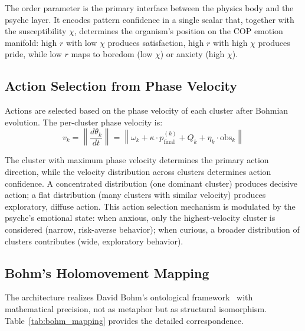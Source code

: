 \documentclass[11pt,a4paper,twocolumn]{article}
\begin{document}
The order parameter is the primary interface between the physics body and the psyche layer.
It encodes pattern confidence in a single scalar that, together with the susceptibility $\chi$, determines the organism's position on the COP emotion manifold: high $r$ with low $\chi$ produces satisfaction, high $r$ with high $\chi$ produces pride, while low $r$ maps to boredom (low $\chi$) or anxiety (high $\chi$).

\subsection{Action Selection from Phase Velocity}

Actions are selected based on the phase velocity of each cluster after Bohmian evolution.
The per-cluster phase velocity is:
\begin{equation}
v_k = \left\|\frac{d\theta_k}{dt}\right\| = \left\|\omega_k + \kappa \cdot p_{\mathrm{final}}^{(k)} + Q_k + \eta_k \cdot \mathrm{obs}_k\right\|
\label{eq:phase_velocity}
\end{equation}

The cluster with maximum phase velocity determines the primary action direction, while the velocity distribution across clusters determines action confidence.
A concentrated distribution (one dominant cluster) produces decisive action; a flat distribution (many clusters with similar velocity) produces exploratory, diffuse action.
This action selection mechanism is modulated by the psyche's emotional state: when anxious, only the highest-velocity cluster is considered (narrow, risk-averse behavior); when curious, a broader distribution of clusters contributes (wide, exploratory behavior).

\subsection{Bohm's Holomovement Mapping}

The architecture realizes David Bohm's ontological framework~\cite{bohm1980} with mathematical precision, not as metaphor but as structural isomorphism.
Table~\ref{tab:bohm_mapping} provides the detailed correspondence.
\end{document}
